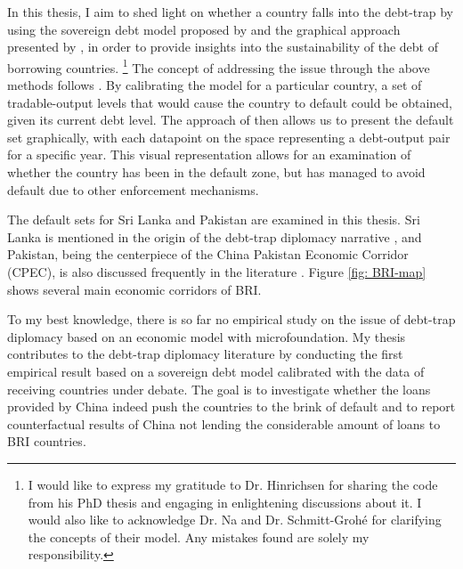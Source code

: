 In this thesis, I aim to shed light on whether a country falls into the debt-trap by using the sovereign debt model proposed by \citet{Na-18} and the graphical approach presented by \citet{Hinrichsen_2020-chapter4}, in order to provide insights into the sustainability of the debt of borrowing countries.%
\footnote{
    I would like to express my gratitude to Dr. Hinrichsen for sharing the code from his PhD thesis and engaging in enlightening discussions about it. I would also like to acknowledge Dr. Na and Dr. Schmitt-Grohé for clarifying the concepts of their model. Any mistakes found are solely my responsibility.
}
The concept of addressing the issue through the above methods follows \citet{Ho-23-debt-trap}.
By calibrating the model for a particular country, a set of tradable-output levels that would cause the country to default could be obtained, given its current debt level. The approach of \citet{Hinrichsen_2020-chapter4} then allows us to present the default set graphically, with each datapoint on the space representing a debt-output pair for a specific year. This visual representation allows for an examination of whether the country has been in the default zone, but has managed to avoid default due to other enforcement mechanisms.

The default sets for Sri Lanka and Pakistan are examined in this thesis. Sri Lanka is mentioned in the origin of the debt-trap diplomacy narrative \citep{Chellaney_2017}, and Pakistan, being the centerpiece of the China Pakistan Economic Corridor (CPEC), is also discussed frequently in the literature \citep{Hurley19-8-debt-trap}. Figure \ref{fig: BRI-map} shows several main economic corridors of BRI.

To my best knowledge, there is so far no empirical study on the issue of debt-trap diplomacy based on an economic model with microfoundation. My thesis contributes to the debt-trap diplomacy literature by conducting the first empirical result based on a sovereign debt model calibrated with the data of receiving countries under debate. The goal is to investigate whether the loans provided by China indeed push the countries to the brink of default and to report counterfactual results of China not lending the considerable amount of loans to BRI countries.

